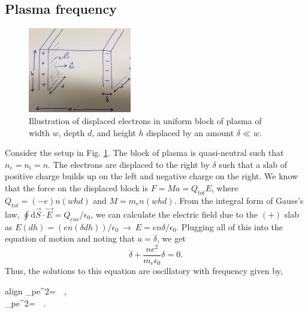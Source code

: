 	\subsection{Plasma frequency}
	\begin{figure}
		\centering
		\includegraphics[width=0.4\textwidth]{figures/plasma_frequency.jpeg}
		\caption{Illustration of displaced electrons in uniform block of plasma of width $w$, depth $d$, and height $h$ displaced by an amount $\delta\ll w$.}
		\label{fig:plasma_freq}
	\end{figure}
	Consider the setup in Fig. \ref{fig:plasma_freq}. The block of plasma is quasi-neutral such that $n_e=n_i=n$. The electrons are displaced to the right by $\delta$ such that a slab of positive charge builds up on the left and negative charge on the right. We know that the force on the displaced block is $F=Ma=Q_{tot}E$, where $Q_{tot}=(-e)n(whd)$ and $M=m_en(whd)$. From the integral form of Gauss's law, $\oint\mathrm{d}\vec{S}\cdot\vec{E}=Q_{enc}/\epsilon_0$, we can calculate the electric field due to the $(+)$ slab as $E(dh)=(en(\delta dh))/\epsilon_0~\rightarrow~E=en\delta/\epsilon_0$. Plugging all of this into the equation of motion and noting that $a=\ddot{\delta}$, we get
	\begin{equation}
		\ddot{\delta} + \frac{ne^2}{m_e\epsilon_0}\delta = 0.
	\end{equation}
	Thus, the solutions to this equation are oscillatory with frequency given by,
	\begin{empheq}[box=\widefbox]{align}
		\omega_{pe}^2=~~,\\
		\omega_{pe}^2=~~.
	\end{empheq}

